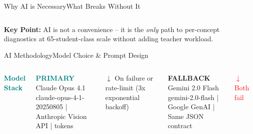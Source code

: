 \documentclass[aspectratio=169,10pt]{beamer}
\begin{document}
\begin{frame}[t,shrink=5]{Why AI is Necessary}{What Breaks Without It}
\begin{columns}[T]
\end{columns}
\vspace{6pt}
\colorbox{card}{\parbox{0.92\textwidth}{\centering\vspace{3pt}
  \textcolor{orng}{\small\textbf{Key Point:}}\;
  \textcolor{txt}{\small AI is not a convenience -- it is the \textit{only} path to per-concept
  diagnostics at 65-student-class scale without adding teacher workload.}
\vspace{3pt}}}
\end{frame}

\begin{frame}[t,shrink=5]{AI Methodology}{Model Choice \& Prompt Design}
\begin{columns}[T]

\vspace{4pt}
\textcolor{teal}{\small\textbf{Model Stack}}\\[5pt]

\colorbox{card}{\parbox{0.92\linewidth}{%
  \vspace{3pt}
  \textcolor{teal}{\scriptsize\textbf{PRIMARY}}\; \textcolor{txt}{\scriptsize Claude Opus 4.1}\\
  \textcolor{txtsec}{\tiny claude-opus-4-1-20250805 \;|\; Anthropic Vision API \;| tokens}
\vspace{3pt}}}

\vspace{2pt}
\colorbox{card}{\parbox{0.92\linewidth}{\centering\vspace{1pt}
  \textcolor{orng}{\tiny $\downarrow$ On failure or rate-limit (3x exponential backoff)}
\vspace{1pt}}}
\vspace{2pt}

\colorbox{card}{\parbox{0.92\linewidth}{%
  \vspace{3pt}
  \textcolor{orng}{\scriptsize\textbf{FALLBACK}}\; \textcolor{txt}{\scriptsize Gemini 2.0 Flash}\\
  \textcolor{txtsec}{\tiny gemini-2.0-flash \;|\; Google GenAI \;|\; Same JSON contract}
\vspace{3pt}}}

\vspace{2pt}
\colorbox{card}{\parbox{0.92\linewidth}{\centering\vspace{1pt}
  \textcolor{red}{\tiny $\downarrow$ Both fail}
\vspace{1pt}}}
\vspace{2pt}


\end{columns}
\end{frame}
\end{document}
